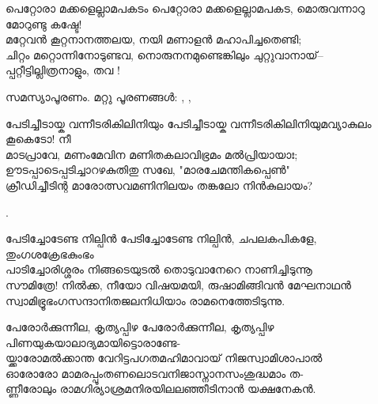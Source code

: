 \begin{enumerate}


\begin{slokam}{\VSr}{\Unk}{പെറ്റോരാ മക്കളെല്ലാമപകടം}
പെറ്റോരാ മക്കളെല്ലാമപകട, മൊരുവന്നാറു മോറുണ്ടു കഷ്ടേ!\\
മറ്റേവന്‍ കൂറ്റനാനത്തലയ, നയി മണാളന്‍ മഹാപിച്ചതെണ്ടി;\\
ചിറ്റം മറ്റൊന്നിനോടുണ്ടവ, നൊരുനനമുണ്ടെങ്കിലും ചുറ്റുവാനായ്‌–\\
പ്പറ്റീട്ടില്ലിത്രനാളും, തവ !
\end{slokam}



സമസ്യാപൂരണം. മറ്റു പൂരണങ്ങൾ: , , 


\begin{slokam}{\VSr}{\Unk}{പേടിച്ചീടായ്ക വന്നീടരികിലിനിയും}
പേടിച്ചീടായ്ക വന്നീടരികിലിനിയുമവ്യാകുലം കൂകെടോ! നീ\\
മാടപ്രാവേ, മണംമേവിന മണിതകലാവിഭ്രമം മൽപ്രിയായാഃ;\\
ഊടപ്പാടെപ്പടിച്ചാറഴകുതിതു സഖേ, "മാരചേമന്തികപ്പെൺ"\\
ക്രീഡിച്ചീടിന്റ മാരോത്സവമണിനിലയം തങ്കലോ നിൻകുലായം?
\end{slokam}


.


\begin{slokam}{\VSr}{\ARRV}{പേടിച്ചോടേണ്ട നില്പിൻ}
പേടിച്ചോടേണ്ട നില്പിൻ, ചപലകപികളേ, തുംഗശക്രേഭകുംഭം\\
പാടിച്ചോരിശ്ശരം നിങ്ങടെയുടൽ തൊടുവാനേറെ നാണിച്ചിടുന്നൂ\\
സൗമിത്രേ! നിൽക്ക, നീയോ വിഷയമയി, രുഷാമിങ്ങിവൻ മേഘനാഥൻ\\
സ്വാമിഭ്രൂഭംഗസന്ദാനിതജലനിധിയാം രാമനെത്തേടിടുന്നു. 
\end{slokam}


\begin{slokam}{\VSr}{\GSK}{പേരോർക്കുന്നീല, കൃത്യപ്പിഴ}
പേരോർക്കുന്നീല, കൃത്യപ്പിഴ പിണയുകയാലാദ്യമായിട്ടൊരാണ്ടേ-\\
യ്ക്കാരോമൽക്കാന്ത വേറിട്ടപഗതമഹിമാവായ് നിജസ്വാമിശാപാൽ\\
ഓരോരോ മാമരപ്പൂംതണലൊടവനിജാസ്നാനസംശുദ്ധമാം ത-\\
ണ്ണീരോലും രാമഗിര്യാശ്രമനിരയിലലഞ്ഞീടിനാൻ യക്ഷനേകൻ.
\end{slokam}



\end{enumerate}
